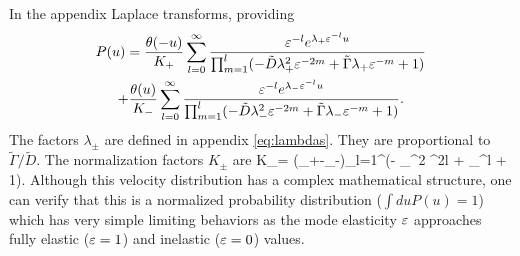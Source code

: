 In the appendix \DIFdelbegin {}\DIFdelend \DIFaddbegin {}\DIFaddend Laplace transforms, providing
\begin{multline} P(u) = \frac{\theta(-u)}{K_+}\sum_{l=0}^\infty \frac{\varepsilon^{-l}e^{\lambda_+\varepsilon^{-l}u}}{\prod_{m=1}^l(-\tilde{D} \lambda_+^2 \varepsilon^{-2m} + \tilde{\Gamma} \lambda_+ \varepsilon^{-m} + 1) } 
	\\+ \frac{\theta(u)}{K_-}\sum_{l=0}^\infty \frac{\varepsilon^{-l}e^{\lambda_-\varepsilon^{-l}u}}{\prod_{m=1}^l(- \tilde{D} \lambda_-^2 \varepsilon^{-2m} + \tilde{\Gamma} \lambda_- \varepsilon^{-m} + 1) } \label{eq:steadystate}. \end{multline}
The factors $\lambda_\pm$ are defined in appendix \DIFdelbegin {}\DIFdelend \DIFaddbegin {}\DIFaddend \ref{eq:lambdas}. They are proportional to $\tilde{\Gamma}/\tilde{D}$. 
The normalization factors \DIFdelbegin {}\DIFdelend $K_\pm$ are 
\be K_\pm = (\lambda_+-\lambda_-)\prod_{l=1}^\infty (- \lambda_\pm^2 \ve^{2l} +\tilde{\Gamma} \lambda_\pm \ve^{l} + 1). \ee
Although this velocity distribution has a complex mathematical structure, one can verify that this is a normalized probability distribution ($\int du P(u) = 1$) which has very simple limiting behaviors as the mode elasticity $\varepsilon$ approaches fully elastic ($\varepsilon=1$) and inelastic ($\varepsilon = 0$) values.
\DIFdelbegin {}\DIFdelend 

